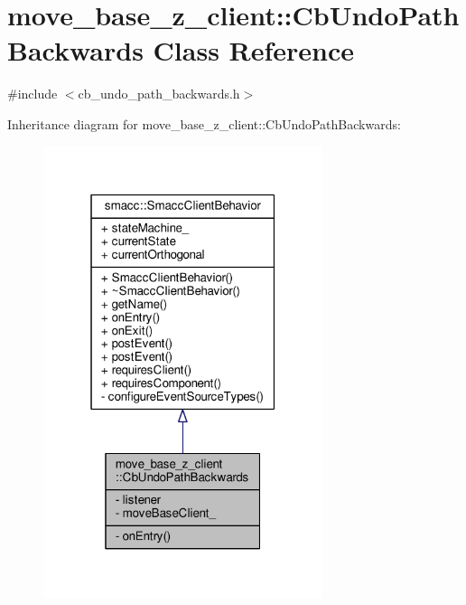\hypertarget{classmove__base__z__client_1_1CbUndoPathBackwards}{}\section{move\+\_\+base\+\_\+z\+\_\+client\+:\+:Cb\+Undo\+Path\+Backwards Class Reference}
\label{classmove__base__z__client_1_1CbUndoPathBackwards}


{\ttfamily \#include $<$cb\+\_\+undo\+\_\+path\+\_\+backwards.\+h$>$}



Inheritance diagram for move\+\_\+base\+\_\+z\+\_\+client\+:\+:Cb\+Undo\+Path\+Backwards\+:\nopagebreak
\begin{figure}[H]
\begin{center}
\leavevmode
\includegraphics[width=232pt]{classmove__base__z__client_1_1CbUndoPathBackwards__inherit__graph}
\end{center}
\end{figure}


